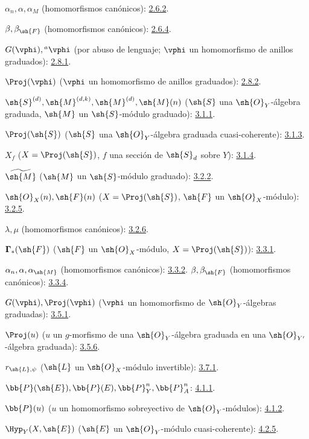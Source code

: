\documentclass[oneside,10pt]{amsart}
\newcommand{\oldpage}[2][]{\marginnote{\normalfont\footnotesize\textbf{#1}~|~#2}\ignorespaces}
\begin{document}
$\alpha_n,\alpha,\alpha_M$ (homomorfismos canónicos): \hyperref[II.2.6.2]{2.6.2}.

$\beta,\beta_{\sh{F}}$ (homomorfismos canónicos): \hyperref[II.2.6.4]{2.6.4}.

$G(\vphi),{}^a\vphi$ (por abuso de lenguaje;
$\vphi$ un homomorfismo de anillos graduados): \hyperref[II.2.8.1]{2.8.1}.

$\Proj(\vphi)$ ($\vphi$ un homomorfismo de anillos graduados): \hyperref[II.2.8.2]{2.8.2}.

$\sh{S}^{(d)},\sh{M}^{(d,k)},\sh{M}^{(d)},\sh{M}(n)$
($\sh{S}$ una $\sh{O}_Y$-álgebra graduada,
$\sh{M}$ un $\sh{S}$-módulo graduado): \hyperref[II.3.1.1]{3.1.1}.

$\Proj(\sh{S})$ ($\sh{S}$ una $\sh{O}_Y$-álgebra graduada cuasi-coherente): \hyperref[II.3.1.3]{3.1.3}.

$X_f$ ($X=\Proj(\sh{S})$, $f$ una sección de $\sh{S}_d$ sobre $Y$): \hyperref[II.3.1.4]{3.1.4}.

$\widetilde{\sh{M}}$ ($\sh{M}$ un $\sh{S}$-módulo graduado): \hyperref[II.3.2.2]{3.2.2}.

$\sh{O}_X(n),\sh{F}(n)$
($X=\Proj(\sh{S})$, $\sh{F}$ un $\sh{O}_X$-módulo): \hyperref[II.3.2.5]{3.2.5}.

$\lambda,\mu$ (homomorfismos canónicos): \hyperref[II.3.2.6]{3.2.6}.

$\boldsymbol{\Gamma}_*(\sh{F})$ ($\sh{F}$ un $\sh{O}_X$-módulo,
$X=\Proj(\sh{S})$): \hyperref[II.3.3.1]{3.3.1}.

$\alpha_n,\alpha,\alpha_{\sh{M}}$ (homomorfismos canónicos): \hyperref[II.3.3.2]{3.3.2}.
\oldpage[II]{208}
$\beta,\beta_{\sh{F}}$ (homomorfismos canónicos): \hyperref[II.3.3.4]{3.3.4}.

$G(\vphi),\Proj(\vphi)$
($\vphi$ un homomorfismo de $\sh{O}_Y$-álgebras graduadas): \hyperref[II.3.5.1]{3.5.1}.

$\Proj(u)$ ($u$ un $g$-morfismo de una $\sh{O}_Y$-álgebra graduada
en una $\sh{O}_{Y'}$-álgebra graduada): \hyperref[II.3.5.6]{3.5.6}.

$r_{\sh{L},\psi}$ ($\sh{L}$ un $\sh{O}_X$-módulo invertible): \hyperref[II.3.7.1]{3.7.1}.

$\bb{P}(\sh{E}),\bb{P}(E),\bb{P}_Y^n,\bb{P}_A^n$: \hyperref[II.4.1.1]{4.1.1}.

$\bb{P}(u)$ ($u$ un homomorfismo sobreyectivo de $\sh{O}_Y$-módulos): \hyperref[II.4.1.2]{4.1.2}.

$\Hyp_Y(X,\sh{E})$ ($\sh{E}$ un $\sh{O}_Y$-módulo cuasi-coherente): \hyperref[II.4.2.5]{4.2.5}.
\end{document}
